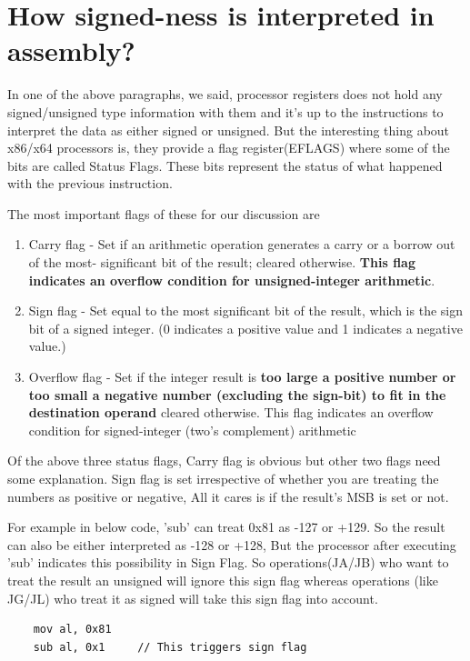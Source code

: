\documentclass{article}
\begin{document}
\section{How signed-ness is interpreted in assembly?}
In one of the above paragraphs, we said, processor registers does not hold any
signed/unsigned type information with them and it's up to the instructions to
interpret the data as either signed or unsigned. But the interesting thing
about x86/x64 processors is, they provide a flag register(EFLAGS) where some of
the bits are called Status Flags. These bits represent the status of what
happened with the previous instruction.

The most important flags of these for our discussion are

\begin{enumerate}[noitemsep]
    \item Carry flag - Set if an arithmetic operation generates a carry or a borrow out of the most-
significant bit of the result; cleared otherwise. \textbf{This flag indicates
an overflow condition for unsigned-integer arithmetic}.
    \item Sign flag - Set equal to the most significant bit of the result, which is the sign bit of a signed
integer. (0 indicates a positive value and 1 indicates a negative value.)
    \item Overflow flag - Set if the integer result is \textbf{too large a
    positive number or too small a negative number (excluding the sign-bit) to
    fit in the destination operand} cleared otherwise. This flag
indicates an overflow condition for signed-integer (two's complement) arithmetic
\end{enumerate}

Of the above three status flags, Carry flag is obvious but other two flags need
some explanation. Sign flag is set irrespective of whether you are treating the
numbers as positive or negative, All it cares is if the result's MSB is set or
not.

For example in below code, 'sub' can treat 0x81 as -127 or +129. So the result
can also be either interpreted as -128 or +128, But the processor after
executing 'sub' indicates this possibility in Sign Flag. So operations(JA/JB)
who want to treat the result an unsigned will ignore this sign flag whereas
operations (like JG/JL) who treat it as signed will take this sign flag into
account.
\begin{verbatim}
    mov al, 0x81
    sub al, 0x1     // This triggers sign flag
\end{verbatim}
\end{document}
